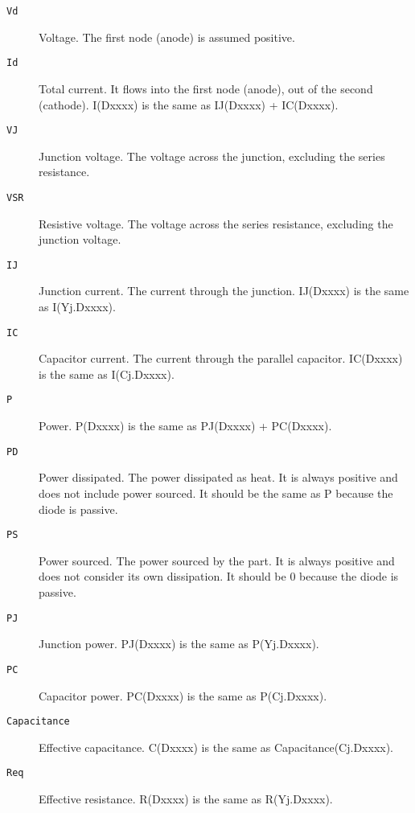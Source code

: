 \begin{description}
  
\item[{\tt Vd}] Voltage.  The first node (anode) is assumed positive.
  
\item[{\tt Id}] Total current.  It flows into the first node (anode),
  out of the second (cathode).  I(Dxxxx) is the same as IJ(Dxxxx) +
  IC(Dxxxx).
  
\item[{\tt VJ}] Junction voltage.  The voltage across the junction,
  excluding the series resistance.

\item[{\tt VSR}] Resistive voltage.  The voltage across the series
  resistance, excluding the junction voltage.

\item[{\tt IJ}] Junction current.  The current through the junction.
  IJ(Dxxxx) is the same as I(Yj.Dxxxx).
  
\item[{\tt IC}] Capacitor current.  The current through the parallel
  capacitor.  IC(Dxxxx) is the same as I(Cj.Dxxxx).
  
\item[{\tt P}] Power.  P(Dxxxx) is the same as PJ(Dxxxx) + PC(Dxxxx).
  
\item[{\tt PD}] Power dissipated.  The power dissipated as heat.  It
  is always positive and does not include power sourced.  It should be
  the same as P because the diode is passive.
  
\item[{\tt PS}] Power sourced.  The power sourced by the part.  It is
  always positive and does not consider its own dissipation.  It
  should be 0 because the diode is passive.
  
\item[{\tt PJ}] Junction power.  PJ(Dxxxx) is the same as P(Yj.Dxxxx).
  
\item[{\tt PC}] Capacitor power.  PC(Dxxxx) is the same as
  P(Cj.Dxxxx).
  
\item[{\tt Capacitance}] Effective capacitance.  C(Dxxxx) is the same
  as Capacitance(Cj.Dxxxx).
  
\item[{\tt Req}] Effective resistance.  R(Dxxxx) is the same as
  R(Yj.Dxxxx).
  

\end{description}
